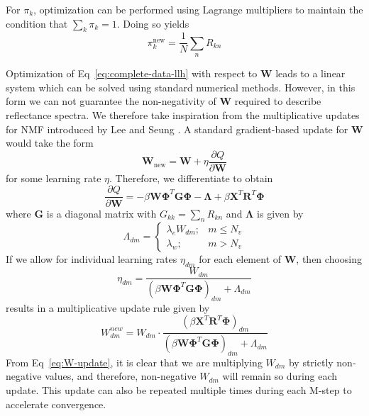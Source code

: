 \documentclass[remotesensing,article,submit,pdftex,moreauthors]{Definitions/mdpi}
\begin{document}
For $\pi_k$, optimization can be performed using Lagrange multipliers to maintain the condition that $\sum_k\pi_k=1$. Doing so yields
\begin{equation}\label{eq:pi-update}
    \pi_k^{\text{new}}  = \frac{1}{N}\sum_n R_{kn}
\end{equation}

Optimization of Eq~\ref{eq:complete-data-llh} with respect to $\mathbf{W}$ leads to a linear system which can be solved using standard numerical methods. However, in this form we can not guarantee the non-negativity of $\mathbf{W}$ required to describe reflectance spectra. We therefore take inspiration from the multiplicative updates for NMF introduced by Lee and Seung \cite{nmf-orig}. A standard gradient-based update for $\mathbf{W}$ would take the form
\begin{equation}
    \mathbf{W}_{\text{new}} = \mathbf{W} + \eta\frac{\partial Q}{\partial \mathbf{W}}
\end{equation}
for some learning rate $\eta$. Therefore, we differentiate to obtain
\begin{equation}
    \frac{\partial Q}{\partial \mathbf{W}} = -\beta \mathbf{W}\mathbf{\Phi}^T\mathbf{G}\mathbf{\Phi} - \mathbf{\Lambda} + \beta \mathbf{X}^T\mathbf{R}^T\mathbf{\Phi}
\end{equation}
where $\mathbf{G}$ is a diagonal matrix with $G_{kk} = \sum_n R_{kn}$ and $\mathbf{\Lambda}$ is given by 
\begin{equation}
    \Lambda_{dm} = \begin{cases}
        \lambda_e W_{dm}; & m \leq N_v \\ 
        \lambda_w; & m > N_v
    \end{cases}
\end{equation}
If we allow for individual learning rates $\eta_{dm}$ for each element of $\mathbf{W}$, then choosing 
\begin{equation}
    \eta_{dm} = \frac{W_{dm}}{\left(\beta \mathbf{W}\mathbf{\Phi}^T\mathbf{G}\mathbf{\Phi}\right)_{dm} + \Lambda_{dm}}
\end{equation}
results in a multiplicative update rule given by
\begin{equation}\label{eq:W-update}
    W_{dm}^{new}  = W_{dm} \cdot \dfrac{\left(\beta \mathbf{X}^T\mathbf{R}^T\mathbf{\Phi}\right)_{dm}}{\left(\beta \mathbf{W}\mathbf{\Phi}^T\mathbf{G}\mathbf{\Phi}\right)_{dm} + \Lambda_{dm}}
\end{equation}
From Eq~\ref{eq:W-update}, it is clear that we are multiplying $W_{dm}$ by strictly non-negative values, and therefore, non-negative $W_{dm}$ will remain so during each update. This update can also be repeated multiple times during each M-step to accelerate convergence.
\end{document}
